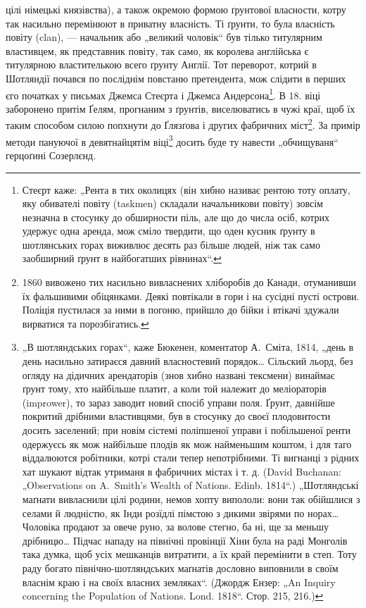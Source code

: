 \parcont{}
цілі німецькі князівства), а також окремою формою ґрунтової власности, котру так насильно перемінюют
в приватну власність. Ті ґрунти, то була власність повіту (clan), — начальник або „великий чоловік“
був тілько титулярним властивцем, як представник повіту, так само, як королева англійська є
титулярною властителькою всего ґрунту Англії. Тот переворот, котрий в Шотляндії почався по посліднім
повстаню претендента, мож слідити в перших єго початках у письмах Джемса Стеєрта і Джемса Андерсона\footnote{
Стеєрт каже: „Рента в тих околицях (він хибно називає рентою тоту оплату, яку обивателі повіту
(taskmen) складали начальникови повіту) зовсім незначна в стосунку до обширности піль, але що до
числа осіб, котрих удержує одна аренда, мож сміло твердити, що оден кусник ґрунту в шотлянських
горах виживлює десять раз більше людей, ніж так само заобширний ґрунт в найбогатших рівнинах“.
}. В 18. віці заборонено притім Ґелям, прогнаним з ґрунтів, виселюватись в чужі краї, щоб їх таким
способом силою попхнути до Ґлязґова і других фабричних міст\footnote{
1860 вивожено тих насильно вивласнених хліборобів до Канади, отуманивши їх фальшивими
обіцянками. Деякі повтікали в гори і на сусідні пусті острови. Поліція пустилася за ними в погоню,
прийшло до бійки і втікачі здужали вирватися та порозбігатись.
}. За примір
методи пануючої в девятнайцятім віці\footnote{
„В шотляндських горах“, каже Бюкенен, коментатор А.~Сміта, 1814, „день в день насильно затираєся
давний власностевий порядок\dots{} Сільский льорд, без огляду на дідичних арендаторів (знов хибно
названі тексмени) винаймає ґрунт тому, хто найбільше платит, а коли той належит до меліораторів
(imprower), то зараз заводит новий спосіб управи поля. Ґрунт, давнійше покритий дрібними
властивцями, був в стосунку до своєї плодовитости досить заселений; при новім сістемі поліпшеної
управи і побільшеної ренти одержуєсь як мож найбільше плодів як мож найменьшим коштом, і для таго
віддалюются робітники, котрі стали тепер непотрібними. Ті вигнанці з рідних хат шукают відтак
утриманя в фабричних містах і т. д. (David Buchanan: „Observations on A.~Smith’s Wealth of Nations.
Edinb. 1814“.) „Шотляндські маґнати вивласнили цілі родини, немов хопту випололи: вони так обійшлися
з селами й людністю, як Інди розїдлі пімстою з дикими звірями по норах\dots{} Чоловіка продают
за овече руно, за волове стегно, ба ні, ще за меньшу дрібницю\dots{} Підчас нападу на північні
провінції Хіни була на раді Монголів така думка, щоб усіх мешканців витратити, а їх край перемінити
в степ. Тоту раду богато північно-шотляндських маґнатів дословно виповнили в своїм власнім краю і на
своїх власних земляках“. (Джордж Ензер: „An Inquiry concerning the Population of Nations. Lond.
1818“. Стор. 215, 216.)
} досить буде ту навести „обчищуваня“ герцоґині Созерлєнд.
